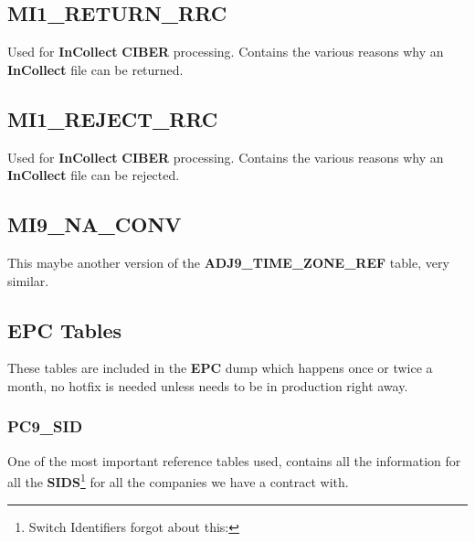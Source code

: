 \documentclass[12pt,twoside]{article}
\begin{document}
\normalsize
\subsection{MI1\_RETURN\_RRC}
\label{sec-9-11}

   Used for \textbf{InCollect} \textbf{CIBER} processing. Contains the various
   reasons why an \textbf{InCollect} file can be returned.
\subsection{MI1\_REJECT\_RRC}
\label{sec-9-12}

   Used for \textbf{InCollect} \textbf{CIBER} processing. Contains the various
   reasons why an \textbf{InCollect} file can be rejected.
\subsection{MI9\_NA\_CONV}
\label{sec-9-13}

   This maybe another version of the \textbf{ADJ9\_TIME\_ZONE\_REF} table,
   very similar.
\subsection{EPC Tables}
\label{sec-9-14}

   These tables are included in the \textbf{EPC} dump which happens once or twice a month, no hotfix is needed unless needs to be in production right away.
\subsubsection{PC9\_SID}
\label{sec-9-14-1}

   One of the most important reference tables used, contains all
   the information for all the \textbf{SIDS}\footnote{Switch Identifiers
forgot about this:
 } for all the companies we
   have a contract with.
\scriptsize
\end{document}
